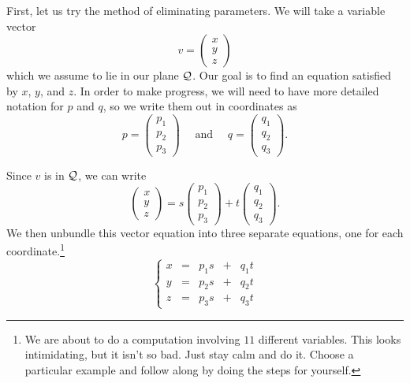 \documentclass[00-livre-main.tex]{subfiles}
\begin{document}
First, let us try the method of eliminating parameters. We will take a variable vector
\[
v = \begin{pmatrix} x \\ y \\z \end{pmatrix}
\]
which we assume to lie in our plane $\mathcal{Q}$. Our goal is to find an equation satisfied by $x$, $y$, and $z$. In order to make progress, we will need to have more detailed notation for $p$ and $q$, so we write them out in coordinates as
\[
p = \begin{pmatrix} p_1 \\ p_2 \\ p_3 \end{pmatrix} \quad \text{ and } \quad
q = \begin{pmatrix} q_1 \\ q_2 \\ q_3 \end{pmatrix} .
\]



Since $v$ is in $\mathcal{Q}$, we can write
\[
\begin{pmatrix} x \\ y \\ z \end{pmatrix} = s \begin{pmatrix} p_1 \\ p_2 \\ p_3 \end{pmatrix} + t \begin{pmatrix} q_1 \\ q_2 \\ q_3 \end{pmatrix}.
\]
We then unbundle this vector equation into three separate equations, one for each coordinate.\footnote{We are about to do a computation involving $11$ different variables. This looks intimidating, but it isn't so bad. Just stay calm and do it. Choose a particular example and follow along by doing the steps for yourself.}
\[
\left\{ \begin{array}{rrrrr}
x & = & p_1 s & + & q_1 t \\
y & = & p_2 s & + & q_2 t \\
z & = & p_3 s & + & q_3 t 
\end{array}\right.
\]
\end{document}
